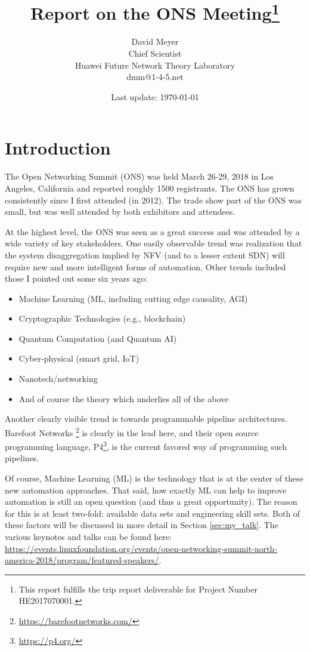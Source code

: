 \documentclass[11pt, oneside]{article}   	%
\title{Report on the ONS Meeting\footnote{This report fulfills the trip report deliverable for Project Number HE2017070001.}}
\author{David Meyer \\
Chief Scientist \\
Huawei Future Network Theory Laboratory \\
dmm@1-4-5.net}
\date{Last update: \today}							%
\begin{document}
\maketitle

\section{Introduction} 
\label{sec:intro}
The Open Networking Summit (ONS) was held March 26-29, 2018 in Los Angeles, California and reported roughly 1500 registrants. The ONS has grown consistently since I first attended (in 2012). The trade show part of the ONS was small, but was well attended by both exhibitors and attendees.

\bigskip
\noindent
At the highest level, the ONS was seen as a great success and was attended by a wide variety of key stakeholders.  One easily observable trend was realization that the system disaggregation implied by NFV (and to a lesser extent SDN) will require new and more intelligent forms of automation. Other trends included those I pointed out some six years ago:  

\begin{itemize}
\item Machine Learning (ML, including cutting edge causality, AGI)
\item Cryptographic Technologies (e.g., blockchain)
\item Quantum Computation (and Quantum AI)
\item Cyber-physical (smart grid,  IoT)
\item Nanotech/networking
\item And of course the theory which underlies all of the above
\end{itemize}

\bigskip
\noindent
Another clearly visible trend is towards programmable pipeline architectures. Barefoot Networks \footnote{\url{https://barefootnetworks.com/}} is clearly in the lead here, and their open source programming language, P4\footnote{\url{https://p4.org/}}, is the current favored way of programming such pipelines. 

\bigskip
\noindent
Of course, Machine Learning (ML) is the technology that is at the center of these new automation approaches. That said, how exactly ML can help to improve automation is still an open question (and thus a great opportunity). The reason for this is at least two-fold: available data sets and engineering skill sets. Both of these factors will be discussed in more detail in Section \ref{sec:my_talk}. The various keynotes and talks can be found here: \url{https://events.linuxfoundation.org/events/open-networking-summit-north-america-2018/program/featured-speakers/}.
\end{document}
